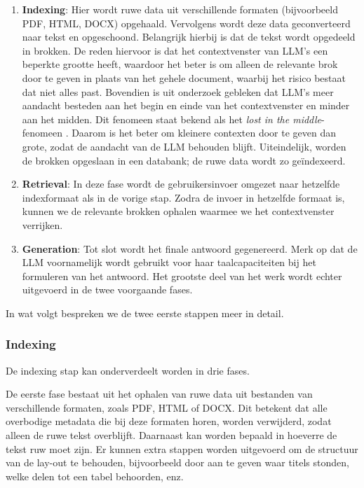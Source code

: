 \begin{enumerate} 
    \item \textbf{Indexing}: Hier wordt ruwe data uit verschillende formaten (bijvoorbeeld PDF, HTML, DOCX) opgehaald. Vervolgens wordt deze data geconverteerd naar tekst en opgeschoond. Belangrijk hierbij is dat de tekst wordt opgedeeld in brokken. De reden hiervoor is dat het contextvenster van LLM's een beperkte grootte heeft, waardoor het beter is om alleen de relevante brok door te geven in plaats van het gehele document, waarbij het risico bestaat dat niet alles past. Bovendien is uit onderzoek gebleken dat LLM's meer aandacht besteden aan het begin en einde van het contextvenster en minder aan het midden. Dit fenomeen staat bekend als het \emph{lost in the middle}-fenomeen \autocite{Databricks}. Daarom is het beter om kleinere contexten door te geven dan grote, zodat de aandacht van de LLM behouden blijft. Uiteindelijk, worden de brokken opgeslaan in een databank; de ruwe data wordt zo geïndexeerd. 
    \item \textbf{Retrieval}: In deze fase wordt de gebruikersinvoer omgezet naar hetzelfde indexformaat als in de vorige stap. Zodra de invoer in hetzelfde formaat is, kunnen we de relevante brokken ophalen waarmee we het contextvenster verrijken.   
    \item \textbf{Generation}: Tot slot wordt het finale antwoord gegenereerd. Merk op dat de \acrshort{LLM} voornamelijk wordt gebruikt voor haar taalcapaciteiten bij het formuleren van het antwoord. Het grootste deel van het werk wordt echter uitgevoerd in de twee voorgaande fases.
\end{enumerate}

In wat volgt bespreken we de twee eerste stappen meer in detail.

\subsubsection{Indexing}%
\label{subsubsec:indexing}

De indexing stap kan onderverdeelt worden in drie fases.

De eerste fase bestaat uit het ophalen van ruwe data uit bestanden van verschillende formaten, zoals PDF, HTML of DOCX. Dit betekent dat alle overbodige metadata die bij deze formaten horen, worden verwijderd, zodat alleen de ruwe tekst overblijft. Daarnaast kan worden bepaald in hoeverre de tekst ruw moet zijn. Er kunnen extra stappen worden uitgevoerd om de structuur van de lay-out te behouden, bijvoorbeeld door aan te geven waar titels stonden, welke delen tot een tabel behoorden, enz.

